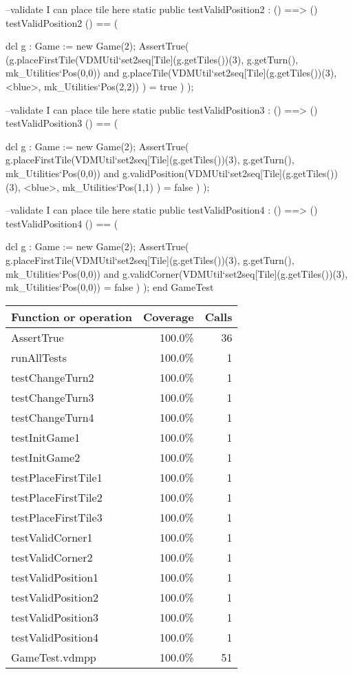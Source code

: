 \begin{vdm_al}
 --validate I can place tile here
 static public testValidPosition2 : () ==> ()
 testValidPosition2 () == (
  
  dcl g : Game := new Game(2);
  AssertTrue( (g.placeFirstTile(VDMUtil`set2seq[Tile](g.getTiles())(3), g.getTurn(),
       mk_Utilities`Pos(0,0)) and g.placeTile(VDMUtil`set2seq[Tile](g.getTiles())(3),
       <blue>, mk_Utilities`Pos(2,2)) ) = true )
 );
 
 --validate I can place tile here
 static public testValidPosition3 : () ==> ()
 testValidPosition3 () == (
  
  dcl g : Game := new Game(2);
  AssertTrue( g.placeFirstTile(VDMUtil`set2seq[Tile](g.getTiles())(3), g.getTurn(),
       mk_Utilities`Pos(0,0)) and g.validPosition(VDMUtil`set2seq[Tile](g.getTiles())(3),
       <blue>, mk_Utilities`Pos(1,1) ) = false )
 );
 
 --validate I can place tile here
 static public testValidPosition4 : () ==> ()
 testValidPosition4 () == (
  
  dcl g : Game := new Game(2);
  AssertTrue( g.placeFirstTile(VDMUtil`set2seq[Tile](g.getTiles())(3), g.getTurn(),
       mk_Utilities`Pos(0,0)) and g.validCorner(VDMUtil`set2seq[Tile](g.getTiles())(3),
       mk_Utilities`Pos(0,0)) = false )
 );
end GameTest
\end{vdm_al}
\bigskip
\begin{longtable}{|l|r|r|}
\hline
Function or operation & Coverage & Calls \\
\hline
\hline
AssertTrue & 100.0\% & 36 \\
\hline
runAllTests & 100.0\% & 1 \\
\hline
testChangeTurn2 & 100.0\% & 1 \\
\hline
testChangeTurn3 & 100.0\% & 1 \\
\hline
testChangeTurn4 & 100.0\% & 1 \\
\hline
testInitGame1 & 100.0\% & 1 \\
\hline
testInitGame2 & 100.0\% & 1 \\
\hline
testPlaceFirstTile1 & 100.0\% & 1 \\
\hline
testPlaceFirstTile2 & 100.0\% & 1 \\
\hline
testPlaceFirstTile3 & 100.0\% & 1 \\
\hline
testValidCorner1 & 100.0\% & 1 \\
\hline
testValidCorner2 & 100.0\% & 1 \\
\hline
testValidPosition1 & 100.0\% & 1 \\
\hline
testValidPosition2 & 100.0\% & 1 \\
\hline
testValidPosition3 & 100.0\% & 1 \\
\hline
testValidPosition4 & 100.0\% & 1 \\
\hline
\hline
GameTest.vdmpp & 100.0\% & 51 \\
\hline
\end{longtable}

